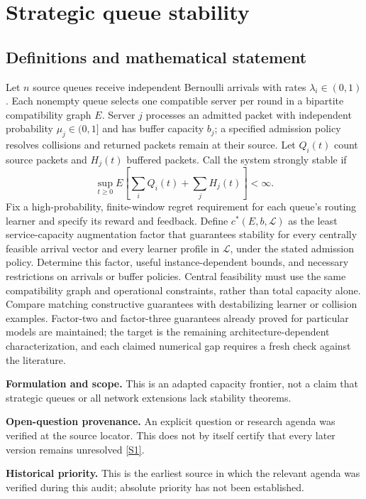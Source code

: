 \documentclass[11pt]{article}
\newcommand{\sref}[2]{\hyperlink{source:#1:#2}{[S#2]}}
\begin{document}
\section*{Strategic queue stability}\label{30007568}
\subsection{Definitions and mathematical statement}
Let \(n\) source queues receive independent Bernoulli arrivals with rates \(\lambda_i\in(0,1)\). Each nonempty queue selects one compatible server per round in a bipartite compatibility graph \(E\). Server \(j\) processes an admitted packet with independent probability \(\mu_j\in(0,1]\) and has buffer capacity \(b_j\); a specified admission policy resolves collisions and returned packets remain at their source. Let \(Q_i(t)\) count source packets and \(H_j(t)\) buffered packets. Call the system strongly stable if
\[
 \sup_{t\geq0}E\left[\sum_iQ_i(t)+\sum_jH_j(t)\right]<\infty.
\]
Fix a high-probability, finite-window regret requirement for each queue's routing learner and specify its reward and feedback. Define \(c^*(E,b,\mathcal L)\) as the least service-capacity augmentation factor that guarantees stability for every centrally feasible arrival vector and every learner profile in \(\mathcal L\), under the stated admission policy. Determine this factor, useful instance-dependent bounds, and necessary restrictions on arrivals or buffer policies. Central feasibility must use the same compatibility graph and operational constraints, rather than total capacity alone. Compare matching constructive guarantees with destabilizing learner or collision examples. Factor-two and factor-three guarantees already proved for particular models are maintained; the target is the remaining architecture-dependent characterization, and each claimed numerical gap requires a fresh check against the literature.

\par\textbf{Formulation and scope.} This is an adapted capacity frontier, not a claim that strategic queues or all network extensions lack stability theorems.

\par\textbf{Open-question provenance.} An explicit question or research agenda was verified at the source locator. This does not by itself certify that every later version remains unresolved \sref{30007568}{1}.

\par\textbf{Historical priority.} This is the earliest source in which the relevant agenda was verified during this audit; absolute priority has not been established.
\end{document}
